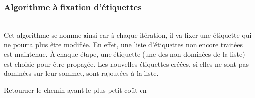 \documentclass[10pt,francais]{llncs}
\begin{document}
\begin{algorithm}\label{algo-correction}
\caption{CORRECTION~: Algorithme \`a correction d'\'etiquettes}
\BlankLine
{}
\BlankLine


\PourTous{}{\;}
\;


\end{algorithm}

\subsubsection{Algorithme \`a fixation d'\'etiquettes \cite{Desrosiers1983}}\label{subsub-resol-progdyn-fix}
~\\
Cet algorithme se nomme ainsi car \`a chaque it\'eration, il va fixer une \'etiquette qui ne pourra plus \^etre modifi\'ee. En effet, une liste d'\'etiquettes non encore trait\'ees est maintenue. \`A chaque \'etape, une \'etiquette (une des non domin\'ees de la liste) est choisie pour \^etre propag\'ee. Les nouvelles \'etiquettes cr\'e\'ees, si elles ne sont pas domin\'ees sur leur sommet, sont rajout\'ees \`a la liste.

\begin{algorithm}\label{algo-fixation}
\caption{FIXATION~: Algorithme \`a fixation d'\'etiquettes}
\BlankLine
{}
\BlankLine


\lPourTous{}{\;}
\BlankLine

\BlankLine
\Tq{}{
  \;
  \;
  \PourTous{}{
	  \Si{}{
			\;
			\;
	  }
  }
  \;
}
Retourner le chemin ayant le plus petit co\^ut en \; 
\end{algorithm}
\end{document}
